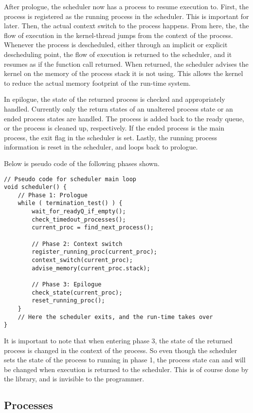 After prologue, the scheduler now has a process to resume execution to. First, the process is registered as the running process in the scheduler. This is important for later. Then, the actual context switch to the process happens. From here, the, the flow of execution in the kernel\hyp{}thread jumps from the context of the process. Whenever the process is descheduled, either through an implicit or explicit descheduling point, the flow of execution is returned to the scheduler, and it resumes as if the function call returned. When returned, the scheduler advises the kernel on the memory of the process stack it is not using. This allows the kernel to reduce the actual memory footprint of the run\hyp{}time system.

In epilogue, the state of the returned process is checked and appropriately handled. Currently only the return states of an unaltered process state or an ended process states are handled. The process is added back to the ready queue, or the process is cleaned up, respectively. If the ended process is the main process, the exit flag in the scheduler is set. Lastly, the running process information is reset in the scheduler, and loops back to prologue.

Below is pseudo code of the following phases shown.
\begin{lstlisting}[style=CustomC]
// Pseudo code for scheduler main loop
void scheduler() {
    // Phase 1: Prologue
    while ( termination_test() ) {
        wait_for_readyQ_if_empty();
        check_timedout_processes();
        current_proc = find_next_process();
        
        // Phase 2: Context switch
        register_running_proc(current_proc);
        context_switch(current_proc);
        advise_memory(current_proc.stack);
        
        // Phase 3: Epilogue
        check_state(current_proc);
        reset_running_proc();      
    }
    // Here the scheduler exits, and the run-time takes over
}
\end{lstlisting}

It is important to note that when entering phase 3, the state of the returned process is chan\-ged in the context of the process. So even though the scheduler sets the state of the process to running in phase 1, the process state can and will be changed when execution is returned to the scheduler. This is of course done by the library, and is invisible to the programmer.


\subsection{Processes}




